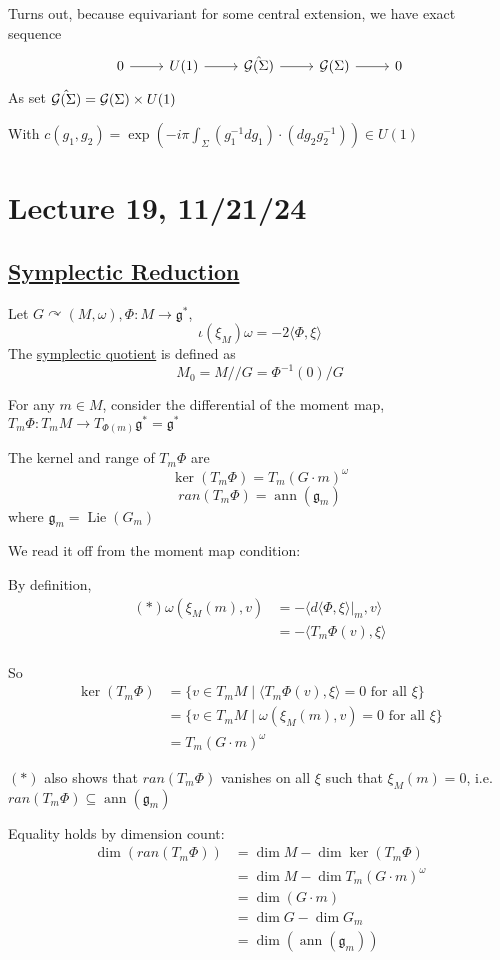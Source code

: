 \documentclass[x11names,reqno,14pt]{extarticle}
\newcommand{\mk}[1]{\mathfrak{#1}}
\newcommand{\g}{\mk{g}}
\DeclareMathOperator{\ann}{ann}
\begin{document}
Turns out, because equivariant for some central extension, we have exact sequence
\[
\exactshort{U(1)}{}{\hat{\mc{G}(\Sigma)}}{}{\mc{G}(\Sigma)}
\]
As set $\hat{\mathcal{G}(\Sigma)} = \mathcal{G}(\Sigma)\times U(1)$

With $c(g_1,g_2) = \exp(-i\pi\int_{\Sigma}(g_1^{-1}dg_1)\cdot(dg_2g_2^{-1}))\in U(1)$

\section*{Lecture 19, 11/21/24}

\subsection*{\underline{Symplectic Reduction}}

Let $G\curvearrowright(M,\omega), \Phi:M\to\g^*$, 
\[
\iota(\xi_M)\omega = -2\langle \Phi,\xi\rangle
\]
The \underline{symplectic quotient} is defined as
\[
M_0 = M//G = \Phi^{-1}(0)/G
\]

For any $m \in M$, consider the differential of the moment map, $T_m\Phi:T_mM\to T_{\Phi(m)}\g^* = \g^*$

\prop The kernel and range of $T_m\Phi$ are 
\[
\ker(T_m\Phi) = T_m(G\cdot m)^\omega
\]
\[
ran(T_m\Phi) = \ann(\g_m)
\]
where $\g_m = \operatorname{Lie}(G_m)$

\proof

We read it off from the moment map condition: 

By definition, 
\begin{align*}
(*)\omega(\xi_M(m),v) & = -\langle d\langle\Phi,\xi\rangle|_m, v\rangle \\
& = -\langle T_m\Phi(v), \xi\rangle \\
\end{align*}

So 
\begin{align*}
\ker(T_m\Phi) & = \{v\in T_mM \mid \langle T_m\Phi(v), \xi\rangle=0\text{ for all }\xi \} \\
& = \{v \in T_mM \mid \omega(\xi_M(m),v) = 0 \text{ for all } \xi \} \\
& = T_m(G\cdot m)^\omega
\end{align*}

$(*)$ also shows that $ran(T_m\Phi)$ vanishes on all $\xi$ such that $\xi_M(m) = 0$, i.e. $ran(T_m\Phi) \subseteq \ann(\g_m)$

Equality holds by dimension count:
\begin{align*}
\dim(ran(T_m\Phi)) & = \dim M - \dim \ker (T_m\Phi) \\
& = \dim M - \dim T_m(G\cdot m)^\omega \\
& = \dim(G\cdot m) \\
& = \dim G - \dim G_m \\
& = \dim(\ann(\g_m)) 
\end{align*}
\end{document}
